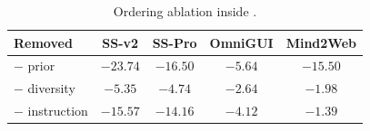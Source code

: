 \begin{table}[t]
\begin{minipage}[t]{0.425\textwidth}
{            \footnotesize
            \setlength{\tabcolsep}{4pt}
            \renewcommand{\arraystretch}{1.3}
            \begin{tabular}{l cccc}
                \toprule
                \textbf{Removed} &\textbf{SS-v2} & \textbf{SS-Pro} & \textbf{OmniGUI} & \textbf{Mind2Web} \\
                \midrule
                $-$ prior & $-23.74$ & $-16.50$ & $-5.64$ & $-15.50$ \\
                $-$ diversity & $-5.35$ & $-4.74$ & $-2.64$ & $-1.98$ \\
                $-$ instruction & $-15.57$ & $-14.16$ & $-4.12$ & $-1.39$ \\
                \bottomrule
            \end{tabular}
        }
        \par\vspace{8pt}
        \caption{Ordering ablation inside \nwe{}.}
        \label{tab:ablation-neoform}
    \end{minipage}
    \vspace{-2mm}
\end{table}
